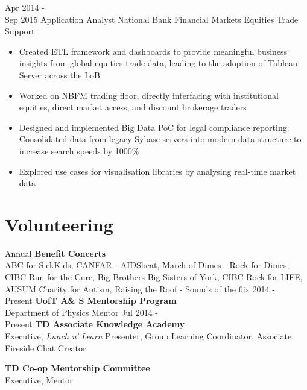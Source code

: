 \documentclass[letterpaper]{twentysecondcv} %
\begin{document}
\begin{twenty}
     \twentyitem
   		{Apr 2014 - \\ Sep 2015}
        {Application Analyst}
        {\href{http://nbfm.ca/}{National Bank Financial Markets}}
        {Equities Trade Support}
        {	\item{}
			\item{}
			\item
			\item			
			\item{}
			\item
			\item{}
			\item{}
        }
        {
        \begin{itemize}
        \item Created ETL framework and dashboards to provide meaningful business insights from global equities trade data, leading to the adoption of Tableau Server across the LoB
        \item Worked on NBFM trading floor, directly interfacing with institutional equities, direct market access, and discount brokerage traders
        \item Designed and implemented Big Data PoC for legal compliance reporting. Consolidated data from legacy Sybase servers into modern data structure to increase search speeds by 1000\% 
        \item Explored use cases for visualisation libraries by analysing real-time market data
	    \end{itemize}
    	}
        
\end{twenty}

\vfill
\section{Volunteering}
\begin{twentyshort}
\twentyitemshort
		{Annual}
		{\textbf{Benefit Concerts} \\ ABC for SickKids, CANFAR - AIDSbeat, March of Dimes - Rock for Dimes, CIBC Run for the Cure, Big Brothers Big Sisters of York, CIBC Rock for LIFE, AUSUM Charity for Autism, Raising the Roof - Sounds of the 6ix}
\twentyitemshort
   		{2014 - \\ Present}
        {\textbf{UofT A\& S Mentorship Program} \\ Department of Physics Mentor}
\twentyitemshort
   		{Jul 2014 - \\ Present}
        {\textbf{TD Associate Knowledge Academy} \\ Executive, \emph{Lunch n' Learn} Presenter, Group Learning Coordinator, Associate Fireside Chat Creator}

\twentyitemshort
   		{}
        {\textbf{TD Co-op Mentorship Committee} \\ Executive, Mentor}
\end{twentyshort}
\end{document}
